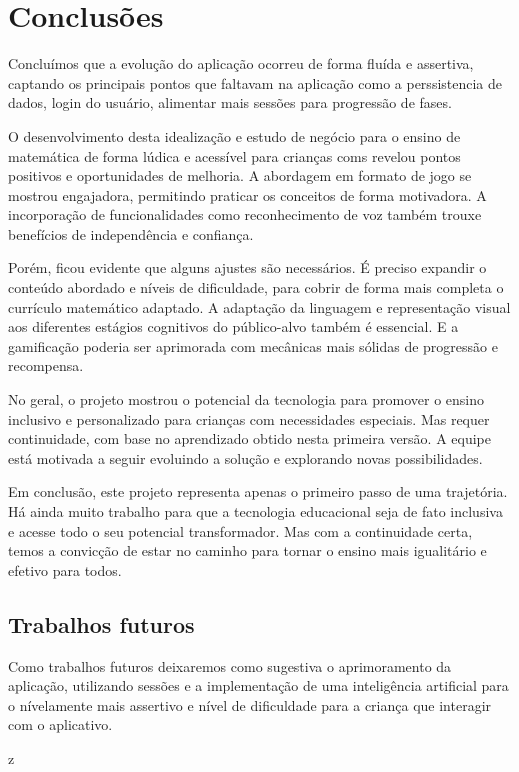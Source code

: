 \chapter{Conclusões}\label{chp:conc}

Concluímos que a evolução do aplicação ocorreu de forma fluída e assertiva, captando os principais pontos que faltavam na aplicação como a perssistencia de dados, login do usuário, alimentar mais sessões para progressão de fases. 

O desenvolvimento desta idealização e estudo de negócio para o ensino de matemática de forma lúdica e acessível para crianças coms revelou pontos positivos e oportunidades de melhoria. A abordagem em formato de jogo se mostrou engajadora, permitindo praticar os conceitos de forma motivadora. A incorporação de funcionalidades como reconhecimento de voz também trouxe benefícios de independência e confiança.

Porém, ficou evidente que alguns ajustes são necessários. É preciso expandir o conteúdo abordado e níveis de dificuldade, para cobrir de forma mais completa o currículo matemático adaptado. A adaptação da linguagem e representação visual aos diferentes estágios cognitivos do público-alvo também é essencial. E a gamificação poderia ser aprimorada com mecânicas mais sólidas de progressão e recompensa.

No geral, o projeto mostrou o potencial da tecnologia para promover o ensino inclusivo e personalizado para crianças com necessidades especiais. Mas requer continuidade, com base no aprendizado obtido nesta primeira versão. A equipe está motivada a seguir evoluindo a solução e explorando novas possibilidades.


Em conclusão, este projeto representa apenas o primeiro passo de uma trajetória. Há ainda muito trabalho para que a tecnologia educacional seja de fato inclusiva e acesse todo o seu potencial transformador. Mas com a continuidade certa, temos a convicção de estar no caminho para tornar o ensino mais igualitário e efetivo para todos.



\section{Trabalhos futuros}

Como trabalhos futuros deixaremos como sugestiva o aprimoramento da aplicação, utilizando sessões e a implementação de uma inteligência artificial para o nívelamente mais assertivo e nível de dificuldade para a criança que interagir com o aplicativo. 



z